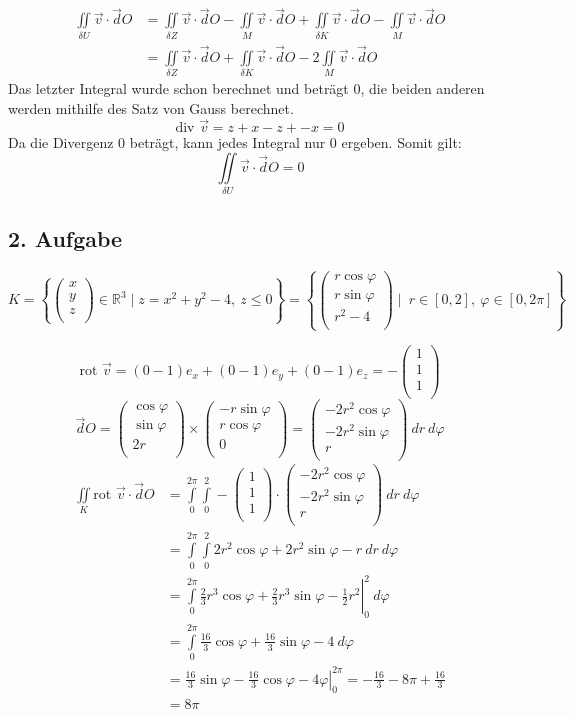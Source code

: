 \documentclass[10pt,a4paper,parskip=half]{scrartcl}
\newcommand{\R}{\mathbb{R}}
\newcommand{\vecthree}[3]{\begin{pmatrix}#1\\#2\\#3\\\end {pmatrix}}
\begin{document}
\begin{enumerate}[(a)]
\begin{align*}
      \iint\limits_{\delta U} \vec v \cdot \vec dO &= \iint\limits_{\delta Z} \vec v \cdot \vec dO - \iint\limits_{M } \vec v \cdot \vec dO + \iint\limits_{\delta K} \vec v \cdot \vec dO - \iint\limits_{M } \vec v \cdot \vec dO\\ 
      &= \iint\limits_{\delta Z} \vec v \cdot \vec dO  + \iint\limits_{\delta K} \vec v \cdot \vec dO - 2\iint\limits_{M } \vec v \cdot \vec dO
    \end{align*}
    Das letzter Integral wurde schon berechnet und beträgt $0$, die beiden anderen werden mithilfe des Satz von Gauss berechnet.
    \[ \text{div } \vec v = z + x - z + - x = 0 \]
    Da die Divergenz 0 beträgt, kann jedes Integral nur 0 ergeben. Somit gilt:
    \[ \iint\limits_{\delta U} \vec v \cdot \vec dO = 0 \]
\end{enumerate}

\subsection*{2. Aufgabe}
\[ K = \left\{  \vecthree{x}{y}{z} \in \R^3 \mid z = x^2 + y^2 - 4,~z \le 0  \right\}  = \left\{  \vecthree{r \cos \varphi}{r \sin \varphi}{r^2 - 4} \mid~ r \in [0,2] ,~ \varphi \in [0,2\pi] \right\} \]

\[ \text{rot } \vec v =  (0 - 1 )e_x + (0 - 1 )e_y + (0 - 1)e_z = -\vecthree{1}{1}{1}\]
\[ \vec dO = \vecthree{\cos \varphi}{\sin \varphi}{2r} \times \vecthree{-r\sin \varphi}{r\cos \varphi}{0} = \vecthree{-2r^2 \cos \varphi}{-2r^2\sin \varphi}{r} ~dr~ d\varphi \]
\begin{align*}
\iint\limits_{K} \text{rot } \vec v \cdot \vec dO &= \int\limits_{0}^{2\pi}\int\limits_{0}^{2} -\vecthree{1}{1}{1} \cdot \vecthree{-2r^2 \cos \varphi}{-2r^2\sin \varphi}{r} ~dr~ d\varphi \\
&= \int\limits_{0}^{2\pi}\int\limits_{0}^{2} 2r^2\cos \varphi + 2r^2 \sin \varphi -r   ~dr~ d\varphi \\
&= \left.\int\limits_{0}^{2\pi} \frac 23 r^3 \cos \varphi + \frac 23 r^3 \sin \varphi - \frac 12 r^2 \right|_{0}^{2}   ~ d\varphi \\
&= \int\limits_{0}^{2\pi} \frac {16}3  \cos \varphi + \frac {16}{3} \sin \varphi - 4   ~ d\varphi \\
&= \left.\frac {16}3  \sin \varphi - \frac {16}{3} \cos \varphi - 4\varphi \right|_{0}^{2\pi}   
= - \frac {16}{3} - 8\pi + \frac{16}{3} \\
&= 8\pi
\end{align*}
\end{document}
